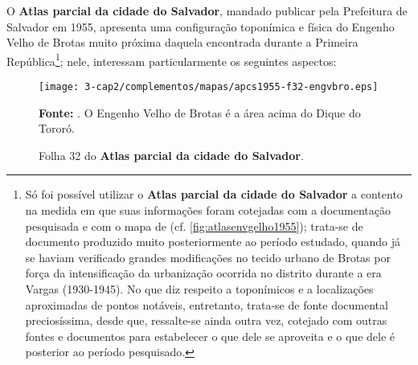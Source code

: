 O \textbf{Atlas parcial da cidade do Salvador}, mandado publicar pela Prefeitura de Salvador em 1955, apresenta uma configuração toponímica e física do Engenho Velho de Brotas muito próxima daquela encontrada durante a Primeira República\footnote{Só foi possível utilizar o \textbf{Atlas parcial da cidade do Salvador} a contento na medida em que suas informações foram cotejadas com a documentação pesquisada e com o mapa de  (cf. \autoref{fig:atlasenvgelho1955}); trata-se de documento produzido muito posteriormente ao período estudado, quando já se haviam verificado grandes modificações no tecido urbano de Brotas por força da intensificação da urbanização ocorrida no distrito durante a era Vargas (1930-1945). No que diz respeito a toponímicos e a localizações aproximadas de pontos notáveis, entretanto, trata-se de fonte documental preciosíssima, desde que, ressalte-se ainda outra vez, cotejado com outras fontes e documentos para estabelecer o que dele se aproveita e o que dele é posterior ao período pesquisado.}; nele, interessam particularmente os seguintes aspectos:

\begin{sidewaysfigure}[!htp]
\centering
\texttt{[image: 3-cap2/complementos/mapas/apcs1955-f32-engvbro.eps]}{\footnotesize \par \textbf{Fonte:} . O Engenho Velho de Brotas é a área acima do Dique do Tororó. \par}
\caption{Folha 32 do \textbf{Atlas parcial da cidade do Salvador}.}
\label{fig:atlasenvgelho1955}
\end{sidewaysfigure}

